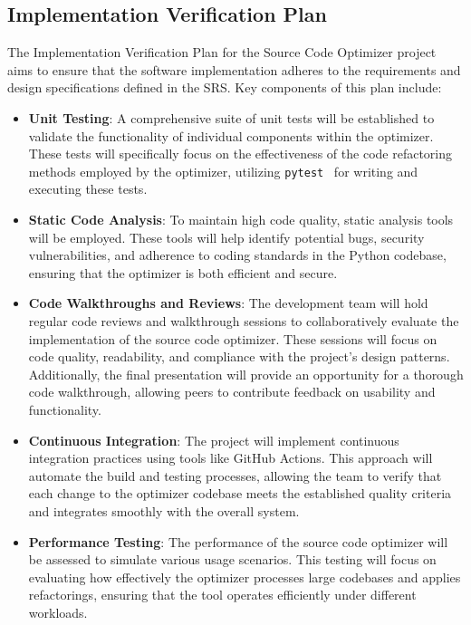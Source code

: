\documentclass[12pt, titlepage]{article}
\begin{document}
\subsection{Implementation Verification Plan}

The Implementation Verification Plan for the Source Code Optimizer
project aims to ensure that the software implementation adheres to
the requirements and design specifications defined in the SRS. Key
components of this plan include:

\begin{itemize}
  \item \textbf{Unit Testing}: A comprehensive suite of unit tests
    will be established to validate the functionality of individual
    components within the optimizer. These tests will specifically
    focus on the effectiveness of the code refactoring methods
    employed by the optimizer, utilizing
    \texttt{pytest}~\cite{pytest} for writing and executing these tests.

  \item \textbf{Static Code Analysis}: To maintain high code quality,
    static analysis tools will be employed. These tools will help
    identify potential bugs, security vulnerabilities, and adherence
    to coding standards in the Python codebase, ensuring that the
    optimizer is both efficient and secure.

  \item \textbf{Code Walkthroughs and Reviews}: The development team
    will hold regular code reviews and walkthrough sessions to
    collaboratively evaluate the implementation of the source code
    optimizer. These sessions will focus on code quality,
    readability, and compliance with the project’s design patterns.
    Additionally, the final presentation will provide an opportunity
    for a thorough code walkthrough, allowing peers to contribute
    feedback on usability and functionality.

  \item \textbf{Continuous Integration}: The project will implement
    continuous integration practices using tools like GitHub Actions.
    This approach will automate the build and testing processes,
    allowing the team to verify that each change to the optimizer
    codebase meets the established quality criteria and integrates
    smoothly with the overall system.

  \item \textbf{Performance Testing}: The performance of the source
    code optimizer will be assessed to simulate various usage
    scenarios. This testing will focus on evaluating how effectively
    the optimizer processes large codebases and applies refactorings,
    ensuring that the tool operates efficiently under different workloads.
\end{itemize}
\end{document}
